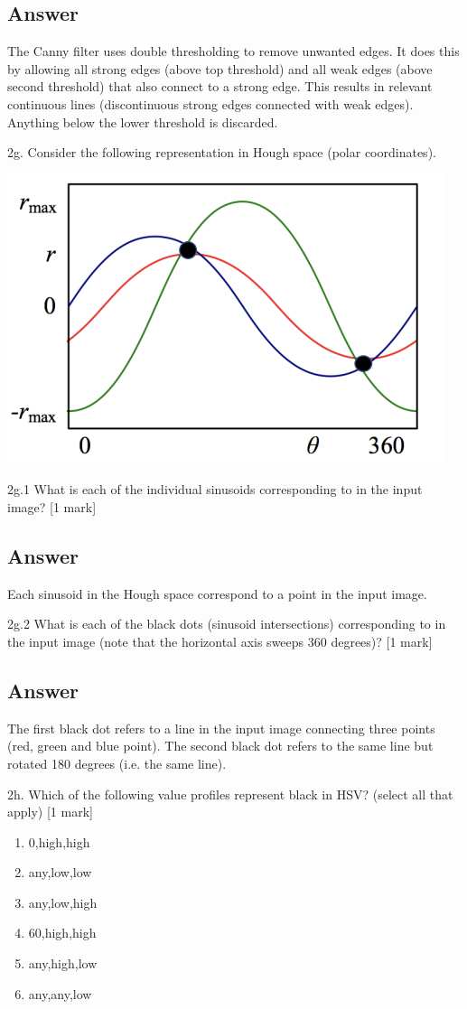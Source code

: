 \documentclass[
	12pt, %
]{fphw}
\begin{document}
\subsection*{Answer}
The Canny filter uses double thresholding to remove unwanted edges. It does this by allowing all strong edges (above top threshold) and all weak edges (above second threshold) that also connect to a strong edge. This results in relevant continuous lines (discontinuous strong edges connected with weak edges). Anything below the lower threshold is discarded.
\begin{problem}
2g. Consider the following representation in Hough space (polar coordinates).
\begin{center}
	\includegraphics[width=0.5\columnwidth, page=1]{2g.png}
\end{center}
\begin{problem}
2g.1 What is each of the individual sinusoids corresponding to in the input image? [1
mark]
\end{problem}
\subsection*{Answer}
Each sinusoid in the Hough space correspond to a point in the input image.
\begin{problem}
2g.2 What is each of the black dots (sinusoid intersections) corresponding to in the input
image (note that the horizontal axis sweeps 360 degrees)? [1 mark]
\end{problem}
\subsection*{Answer}
The first black dot refers to a line in the input image connecting three points (red, green and blue point).
The second black dot refers to the same line but rotated 180 degrees (i.e. the same line).
\end{problem}
\begin{problem}
2h. Which of the following value profiles represent black in HSV? (select all that apply)
[1 mark]
\begin{enumerate}
	\item 0,high,high
	\item any,low,low
	\item any,low,high
	\item 60,high,high
	\item any,high,low
	\item any,any,low
\end{enumerate}
\end{problem}
\end{document}

